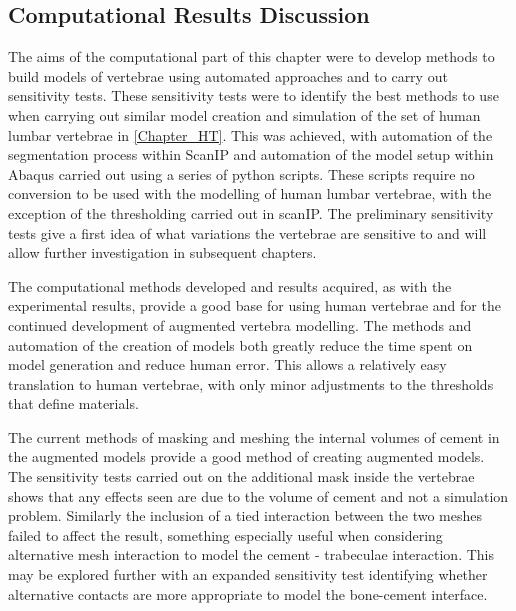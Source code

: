 \subsection{Computational Results Discussion}

The aims of the computational part of this chapter were to develop methods to
build models of vertebrae using automated approaches and to carry out
sensitivity tests. These sensitivity tests were to identify the best methods to use when carrying out similar
model creation and simulation of the set of human lumbar vertebrae in \cref{Chapter_HT}. This
was achieved, with automation of the segmentation process within ScanIP and
automation of the model setup within Abaqus carried out using a series of python
scripts. These scripts require no conversion to be used with the modelling of
human lumbar vertebrae, with the exception of the thresholding carried out in
scanIP. The preliminary sensitivity tests give a first idea of what variations
the vertebrae are sensitive to and will allow further investigation in
subsequent chapters.


The computational methods developed and results acquired, as with the
experimental results, provide a good base for using human vertebrae and for the
continued development of augmented vertebra modelling. The methods and
automation of the creation of models both greatly reduce the time spent on
model generation and reduce human error. This allows a relatively easy
translation to human vertebrae, with only minor adjustments to the thresholds
that define materials.

The current methods of masking and meshing the internal volumes of cement in
the augmented models provide a good method of creating augmented models. The
sensitivity tests carried out on the additional mask inside the vertebrae shows
that any effects seen are due to the volume of cement and not a simulation
problem. Similarly the inclusion of a tied interaction between the two meshes
failed to affect the result, something especially useful when considering
alternative mesh interaction to model the cement - trabeculae interaction. This
may be explored further with an expanded sensitivity test identifying whether
alternative contacts are more appropriate to model the bone-cement interface.

